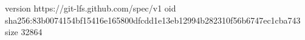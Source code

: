 version https://git-lfs.github.com/spec/v1
oid sha256:83b0074154bf15416e165800dfcdd1e13eb12994b282310f56b6747ec1cba743
size 32864
